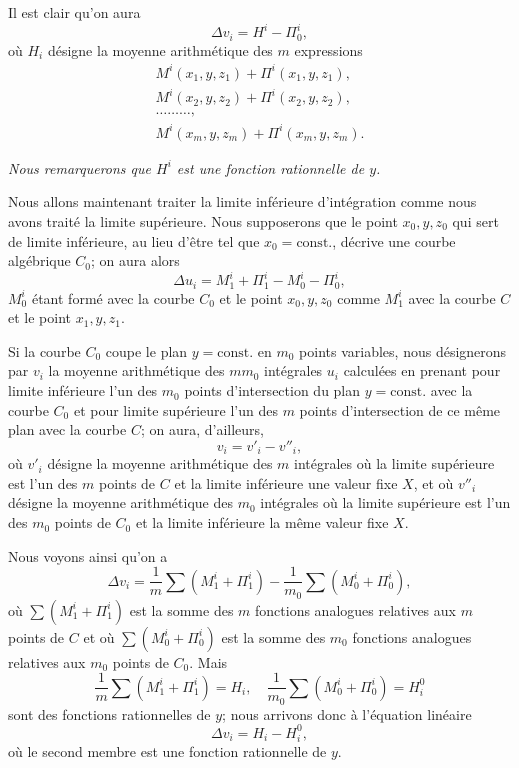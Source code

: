\documentclass{article}
\begin{document}
Il est clair qu'on aura
\[
\Delta v_{i} = H^{i} - \Pi_{0}^{i}, \tag{5 d}
\]
où $H_{i}$ désigne la moyenne arithmétique des $m$ expressions
\[
\begin{gathered}
M^{i}(x_{1}, y, z_{1}) + \Pi^{i}(x_{1}, y, z_{1}), \\
M^{i}(x_{2}, y, z_{2}) + \Pi^{i}(x_{2}, y, z_{2}), \\
\dots\ldots\dots, \\
M^{i}(x_{m}, y, z_{m}) + \Pi^{i}(x_{m}, y, z_{m}).
\end{gathered}
\]

\emph{Nous remarquerons que $H^{i}$ est une fonction rationnelle de $y$.}

Nous allons maintenant traiter la limite inférieure d'intégration comme nous avons traité la limite supérieure. Nous supposerons que le point $x_{0}, y, z_{0}$ qui sert de limite inférieure, au lieu d'être tel que $x_{0} = \text{const.}$, décrive une courbe algébrique $C_{0}$; on aura alors
\[
\Delta u_{i} = M_{1}^{i} + \Pi_{1}^{i} - M_{0}^{i} - \Pi_{0}^{i},
\]
$M_{0}^{i}$ étant formé avec la courbe $C_{0}$ et le point $x_{0}, y, z_{0}$ comme $M_{1}^{i}$ avec la courbe $C$ et le point $x_{1}, y, z_{1}$.

Si la courbe $C_{0}$ coupe le plan $y = \text{const.}$ en $m_{0}$ points variables, nous désignerons par $v_{i}$ la moyenne arithmétique des $m m_{0}$ intégrales $u_{i}$ calculées en prenant pour limite inférieure l'un des $m_{0}$ points d'intersection du plan $y = \text{const.}$ avec la courbe $C_{0}$ et pour limite supérieure l'un des $m$ points d'intersection de ce même plan avec la courbe $C$; on aura, d'ailleurs,
\[
v_{i} = v'_{i} - v''_{i},
\]
où $v'_{i}$ désigne la moyenne arithmétique des $m$ intégrales où la limite supérieure est l'un des $m$ points de $C$ et la limite inférieure une valeur fixe $X$, et où $v''_{i}$ désigne la moyenne arithmétique des $m_{0}$ intégrales où la limite supérieure est l'un des $m_{0}$ points de $C_{0}$ et la limite inférieure la même valeur fixe $X$.

Nous voyons ainsi qu'on a
\[
\Delta v_{i} = \frac{1}{m} \sum (M_{1}^{i} + \Pi_{1}^{i}) - \frac{1}{m_{0}} \sum (M_{0}^{i} + \Pi_{0}^{i}),
\]
où $\displaystyle\sum (M_{1}^{i} + \Pi_{1}^{i})$ est la somme des $m$ fonctions analogues relatives aux $m$ points de $C$ et où $\displaystyle\sum (M_{0}^{i} + \Pi_{0}^{i})$ est la somme des $m_{0}$ fonctions analogues relatives aux $m_{0}$ points de $C_{0}$. Mais
\[
\frac{1}{m} \sum (M_{1}^{i} + \Pi_{1}^{i}) = H_{i}, \quad \frac{1}{m_{0}} \sum (M_{0}^{i} + \Pi_{0}^{i}) = H_{i}^{0}
\]
sont des fonctions rationnelles de $y$; nous arrivons donc à l'équation linéaire
\[
\Delta v_{i} = H_{i} - H_{i}^{0}, \tag{5 e}
\]
où le second membre est une fonction rationnelle de $y$.
\end{document}
